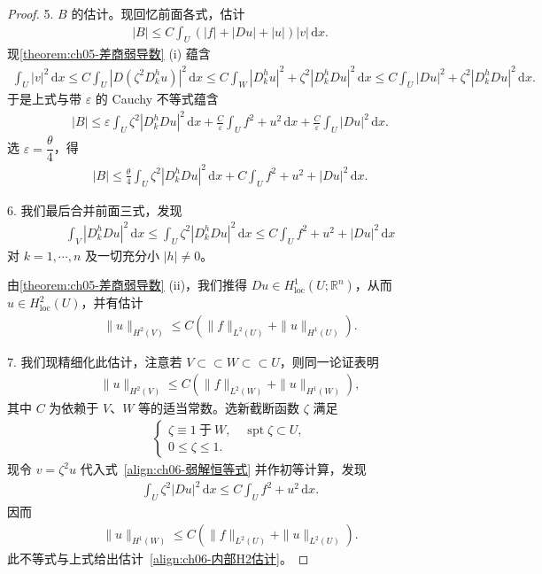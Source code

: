 \documentclass[../../main.tex]{subfiles}
\begin{document}
\begin{proof}
5. $B$ 的估计。现回忆前面各式，估计
\begin{align}
|B|\leqslant C\int_{U}(|f|+|Du|+|u|)|v|\,\mathrm{d}x.
\end{align}
现\cref{theorem:ch05-差商弱导数} (i) 蕴含
\begin{align*}
\int_{U}|v|^{2}\,\mathrm{d}x
\leqslant C\int_{U}|D(\zeta^{2}D_{k}^{h}u)|^{2}\,\mathrm{d}x
\leqslant C\int_{W}|D_{k}^{h}u|^{2}+\zeta^{2}|D_{k}^{h}Du|^{2}\,\mathrm{d}x
\leqslant C\int_{U}|Du|^{2}+\zeta^{2}|D_{k}^{h}Du|^{2}\,\mathrm{d}x.
\end{align*}
于是上式与带 $\varepsilon$ 的 Cauchy 不等式蕴含
\begin{align*}
|B|\leqslant\varepsilon\int_{U}\zeta^{2}|D_{k}^{h}Du|^{2}\,\mathrm{d}x+\frac{C}{\varepsilon}\int_{U}f^{2}+u^{2}\,\mathrm{d}x+\frac{C}{\varepsilon}\int_{U}|Du|^{2}\,\mathrm{d}x.
\end{align*}
选 $\varepsilon=\dfrac{\theta}{4}$，得
\begin{align}
|B|\leqslant\frac{\theta}{4}\int_{U}\zeta^{2}|D_{k}^{h}Du|^{2}\,\mathrm{d}x+C\int_{U}f^{2}+u^{2}+|Du|^{2}\,\mathrm{d}x.
\end{align}

6. 我们最后合并前面三式，发现
\begin{align*}
\int_{V}|D_{k}^{h}Du|^{2}\,\mathrm{d}x\leqslant\int_{U}\zeta^{2}|D_{k}^{h}Du|^{2}\,\mathrm{d}x\leqslant C\int_{U}f^{2}+u^{2}+|Du|^{2}\,\mathrm{d}x
\end{align*}
对 $k=1,\cdots,n$ 及一切充分小 $|h|\neq 0$。

由\cref{theorem:ch05-差商弱导数} (ii)，我们推得 $Du\in H^{1}_{\mathrm{loc}}(U;\mathbb{R}^{n})$，从而 $u\in H^{2}_{\mathrm{loc}}(U)$，并有估计
\begin{align}
\|u\|_{H^{2}(V)}\leqslant C(\|f\|_{L^{2}(U)}+\|u\|_{H^{1}(U)}).
\end{align}

7. 我们现精细化此估计，注意若 $V\subset \subset W\subset \subset U$，则同一论证表明
\begin{align}
\|u\|_{H^{2}(V)}\leqslant C(\|f\|_{L^{2}(W)}+\|u\|_{H^{1}(W)}),
\end{align}
其中 $C$ 为依赖于 $V$、$W$ 等的适当常数。选新截断函数 $\zeta$ 满足
\begin{align*}
\begin{cases}
\zeta\equiv 1\ \text{于}\ W,\quad \operatorname{spt}\zeta\subset U,\\
0\leqslant\zeta\leqslant 1.
\end{cases}
\end{align*}
现令 $v=\zeta^{2}u$ 代入式~\eqref{align:ch06-弱解恒等式} 并作初等计算，发现
\begin{align*}
\int_{U}\zeta^{2}|Du|^{2}\,\mathrm{d}x\leqslant C\int_{U}f^{2}+u^{2}\,\mathrm{d}x.
\end{align*}
因而
\begin{align*}
\|u\|_{H^{1}(W)}\leqslant C(\|f\|_{L^{2}(U)}+\|u\|_{L^{2}(U)}).
\end{align*}
此不等式与上式给出估计~\eqref{align:ch06-内部H2估计}。
\end{proof}
\end{document}
